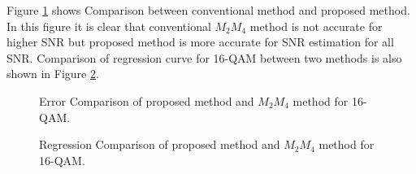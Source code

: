\documentclass[12pt]{report}
\begin{document}
Figure \ref{fig:error_compare_16qam} shows Comparison between conventional method and proposed method. In this figure it is clear that conventional $M_2M_4$ method is not accurate for higher SNR but proposed method is more accurate for SNR estimation for all SNR. Comparison of regression curve for 16-QAM between two methods is also shown in Figure \ref{fig:regression_compare_16qam}.
\begin{figure}[htbp]
	\caption{Error Comparison of proposed method and $M_2 M_4$ method for 16-QAM. }
	\label{fig:error_compare_16qam}
\end{figure}
\begin{figure}[htbp]
	\caption{Regression Comparison of proposed method and $M_2 M_4$ method for 16-QAM. }
	\label{fig:regression_compare_16qam}
\end{figure}
\end{document}

